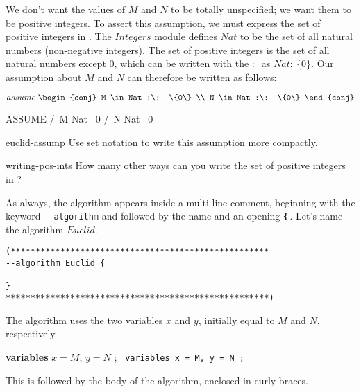 We don't want the values of $M$ and $N$ to be totally unspecified; we
want them to be positive integers.  To assert this assumption, we must
express the set of positive integers in \tlaplus.  The $Integers$
module defines
$Nat$ to be the set of all natural numbers
(non-negative integers).  The set of positive integers is the set of
all natural numbers except 0, which can be written 
with the 
$:\:$ as 
$Nat :\: \{0\}$.
Our assumption about $M$ and $N$ can therefore be written as follows:%
\begin{twocols}
$\ASSUME \; 
     \begin{conj}
        M \in Nat :\: \{0\} \\ N \in Nat :\: \{0\}
     \end{conj}$
\midcol
\begin{verbatim*}
ASSUME /\ M \in Nat \ {0}
       /\ N \in Nat \ {0}
\end{verbatim*}
\end{twocols}
\begin{aquestion}{euclid-assump}
Use set notation to write this assumption more compactly.
\end{aquestion}
\begin{aquestion}{writing-pos-ints}
How many other ways can you write the set of positive integers
in \tlaplus?
\end{aquestion}
%
As always, the algorithm appears inside a multi-line comment,
beginning with the keyword \verb|--algorithm| and followed by the name
and an opening \texttt{\bf\{}\,.  Let's name the algorithm $Euclid$.
\begin{display}
\begin{verbatim}
(****************************************************
--algorithm Euclid {

}
*****************************************************)
\end{verbatim}
\end{display}
The algorithm uses the two
variables $x$ and $y$, initially equal to $M$ and $N$,
respectively.
\begin{twocols}
\textbf{variables} $x = M$, $y = N$ ;
\midcol
\verb*| variables x = M, y = N ;|
\end{twocols}
This is followed by the body of the algorithm, enclosed
in curly braces.

